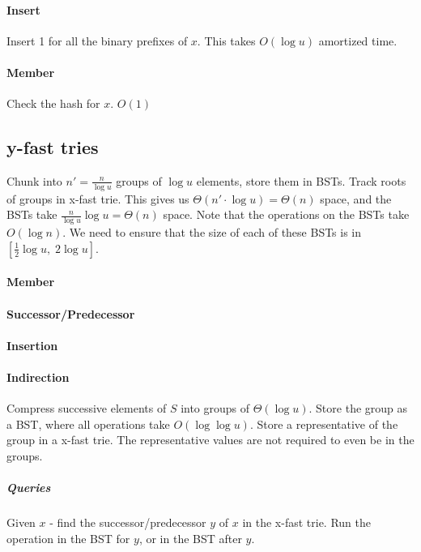\documentclass[a4paper]{article}
\begin{document}
\paragraph{Insert}
Insert 1 for all the binary prefixes of $x$. This takes $O(\log u)$ amortized time.

\paragraph{Member}
Check the hash for $x$. $O(1)$

\subsection{y-fast tries}
Chunk into $n'=\frac{n}{\log u}$ groups of $\log u$ elements, store them in BSTs. Track roots of groups in x-fast trie. This gives us $\Theta(n'\cdot \log u)=\Theta(n)$ space, and the BSTs take $\frac{n}{\log u}\log u=\Theta(n)$ space. Note that the operations on the BSTs take $O(\log n)$. We need to ensure that the size of each of these BSTs is in $\left[\frac{1}{2}\log u, \; 2\log u\right]$.

\paragraph{Member}

\paragraph{Successor/Predecessor}

\paragraph{Insertion}

\paragraph{Indirection}
Compress successive elements of $S$ into groups of $\Theta(\log u)$. Store the group as a BST, where all operations take $O(\log\log u)$. Store a representative of the group in a x-fast trie. The representative values are not required to even be in the groups.

\subparagraph{Queries}
Given $x$ - find the successor/predecessor $y$ of $x$ in the x-fast trie. Run the operation in the BST for $y$, or in the BST after $y$.
\end{document}
